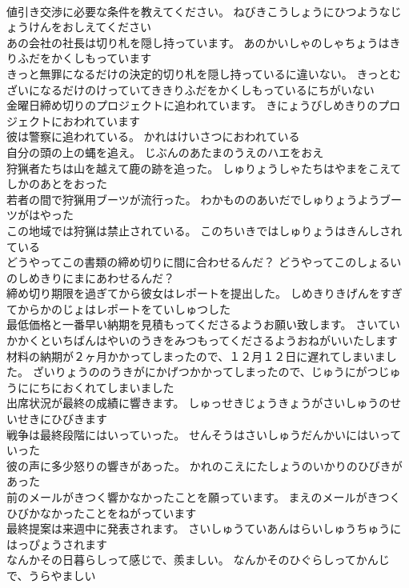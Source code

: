 \documentclass[8pt]{extreport}
\begin{document}
\begin{CJK}{UTF8}{min}
\\	値引き交渉に必要な条件を教えてください。	ねびきこうしょうにひつようなじょうけんをおしえてください 
\\	あの会社の社長は切り札を隠し持っています。	あのかいしゃのしゃちょうはきりふだをかくしもっています 
\\	きっと無罪になるだけの決定的切り札を隠し持っているに違いない。	きっとむざいになるだけのけっていてききりふだをかくしもっているにちがいない 
\\	金曜日締め切りのプロジェクトに追われています。	きにょうびしめきりのプロジェクトにおわれています 
\\	彼は警察に追われている。	かれはけいさつにおわれている 
\\	自分の頭の上の蝿を追え。	じぶんのあたまのうえのハエをおえ 
\\	狩猟者たちは山を越えて鹿の跡を追った。	しゅりょうしゃたちはやまをこえてしかのあとをおった 
\\	若者の間で狩猟用ブーツが流行った。	わかもののあいだでしゅりょうようブーツがはやった 
\\	この地域では狩猟は禁止されている。	このちいきではしゅりょうはきんしされている 
\\	どうやってこの書類の締め切りに間に合わせるんだ？	どうやってこのしょるいのしめきりにまにあわせるんだ？ 
\\	締め切り期限を過ぎてから彼女はレポートを提出した。	しめきりきげんをすぎてからかのじょはレポートをていしゅつした 
\\	最低価格と一番早い納期を見積もってくださるようお願い致します。	さいていかかくといちばんはやいのうきをみつもってくださるようおねがいいたします 
\\	材料の納期が２ヶ月かかってしまったので、１２月１２日に遅れてしまいました。	ざいりょうののうきがにかげつかかってしまったので、じゅうにがつじゅうににちにおくれてしまいました 
\\	出席状況が最終の成績に響きます。	しゅっせきじょうきょうがさいしゅうのせいせきにひびきます 
\\	戦争は最終段階にはいっていった。	せんそうはさいしゅうだんかいにはいっていった 
\\	彼の声に多少怒りの響きがあった。	かれのこえにたしょうのいかりのひびきがあった 
\\	前のメールがきつく響かなかったことを願っています。	まえのメールがきつくひびかなかったことをねがっています 
\\	最終提案は来週中に発表されます。	さいしゅうていあんはらいしゅうちゅうにはっぴょうされます 
\\	なんかその日暮らしって感じで、羨ましい。	なんかそのひぐらしってかんじで、うらやましい 

\end{CJK}
\end{document}
